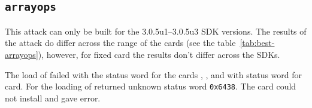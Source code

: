\documentclass{../llncs/llncs}
\begin{document}









            \subsection{\texttt{arrayops}}
            This attack can only be built for the 3.0.5u1--3.0.5u3 SDK versions. The results of the attack do differ across the range of the cards (see the table~\ref{tab:best-arrayops}), however, for fixed card the results don't differ across the SDKs.
            
            The load of \vulnscap failed with the status word \shortswwrongdata for the cards \Fcard, \Gcard, \Hcard and \Inewcard with status word \shortswunknown for \Cnewcard card. For \Jcard the loading of \vulnscap returned unknown status word \texttt{0x6438}. The card \Ccard could not install \vulnscap and gave \shortswconditionsnotsatisfied error. 
\end{document}
